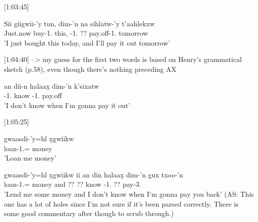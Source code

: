 [1:03:45]
\begin{exe}
\ex \gll Sii giigwii-'y tun, dim-'n na sihlatw-'y t'aahlekxw\\
Just.now buy-1.\Ii{} this, \Fut{}-1.\I{} ?? pay.off-1.\Ii{} tomorrow\\
'I just bought this today, and I'll pay it out tomorrow'
\end{exe}

[1:04:40] --> my guess for the first two words is based on Henry's grammatical sketch (p.58), even though there's nothing preceding AX
\begin{exe}
\ex \gll an dii-n halaax̱ dim-'n k'sixatw\\
\Ax{} \Foc{}-1.\I{} know \Fut{}-1.\I{} pay.off\\
'I don't know when I'm gonna pay it out'
\end{exe}

[1:05:25]
\begin{exe}
\ex \begin{xlist}
\item \gll gwaasdi-'y=hl x̱gwiikw\\
loan-1.\Ii{}=\Cn{} money\\
'Loan me money'
\item \gll gwaasdi-'y=hl x̱gwiikw ii an din halaax̱ dim-'n gux txoo-'n\\
loan-1.\Ii{}=\Cn{} money and ?? ?? know \Fut{}-1.\Ii{} ?? pay-3.\Ii{}\\
'Lend me some money and I don't know when I'm gonna pay you back'
(AS: This one has a lot of holes since I'm not sure if it's been parsed correctly. There is some good commentary after though to scrub through.)
\end{xlist}
\end{exe}

